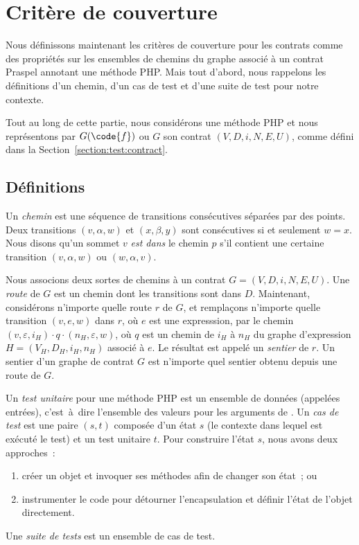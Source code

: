 \section{Critère de couverture}
\label{section:test:criteria}

Nous définissons maintenant les critères de couverture pour les contrats comme
des propriétés sur les ensembles de chemins du graphe associé à un contrat
Praspel annotant une méthode PHP. Mais tout d'abord, nous rappelons les
définitions d'un chemin, d'un cas de test et d'une suite de test pour notre
contexte.

Tout au long de cette partie, nous considérons une méthode PHP  et nous
représentons par $G(\code{f})$ ou $G$ son contrat $(V, D, i, N, E, U)$, comme
défini dans la Section~\ref{section:test:contract}.

\subsection{Définitions}

Un {\em chemin} est une séquence de transitions consécutives séparées par des
points. Deux transitions $(v, \alpha, w)$ et $(x, \beta, y)$ sont consécutives
si et seulement $w = x$. Nous disons qu'un sommet $v$ {\em est dans} le chemin
$p$ s'il contient une certaine transition $(v, \alpha, w)$ ou $(w, \alpha, v)$.

Nous associons deux sortes de chemins à un contrat $G = (V, D, i, N, E, U)$. Une
{\em route} de $G$ est un chemin dont les transitions sont dans $D$. Maintenant,
considérons n'importe quelle route $r$ de $G$, et remplaçons n'importe quelle
transition $(v, e, w)$ dans $r$, où $e$ est une expresssion, par le chemin $(v,
\varepsilon, i_H) \cdot q \cdot (n_H, \varepsilon, w)$, où $q$ est un chemin de
$i_H$ à $n_H$ du graphe d'expression $H = (V_H, D_H, i_H, n_H)$ associé à $e$.
Le résultat est appelé un {\em sentier} de $r$. Un sentier d'un graphe de
contrat $G$ est n'importe quel sentier obtenu depuis une route de $G$.

Un {\em test unitaire} pour une méthode PHP  est un ensemble de données
(appelées entrées), c'est~à~dire l'ensemble des valeurs pour les arguments de
. Un {\em cas de test} est une paire $(s, t)$ composée d'un état $s$ (le
contexte dans lequel est exécuté le test) et un test unitaire $t$. Pour
construire l'état $s$, nous avons deux approches~:
%
\begin{enumerate}

\item créer un objet et invoquer ses méthodes afin de changer son état~; ou

\item instrumenter le code pour détourner l'encapsulation et définir l'état de
l'objet directement.

\end{enumerate}
%
Une {\em suite de tests} est un ensemble de cas de test.

